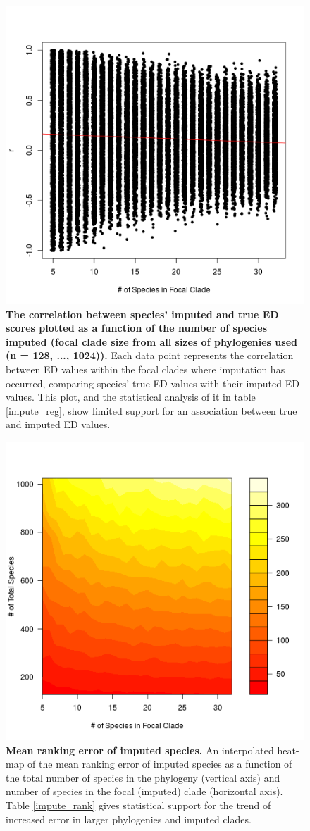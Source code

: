 \documentclass[10pt,english]{article}
\begin{document}
\begin{figure}[!ht]
  \center
  \includegraphics[width=.5\textwidth]{../figures/edModel.png}
  \caption{\textbf{The correlation between species' imputed and true ED scores
      plotted as a function of the number of species imputed (focal clade size
      from all sizes of phylogenies used (n = 128, ..., 1024)).} Each data point
      represents the correlation between ED values within the focal clades where
      imputation has occurred, comparing species' true ED values with their
      imputed ED values. This plot, and the statistical analysis of it in table
      \ref{impute_reg}, show limited support for an association between true and
      imputed ED values.}
  \label{imputationTrend}
\end{figure}

\begin{figure}[!ht]
  \center
  \includegraphics[width=.5\textwidth]{../figures/rankingError.png}
  \caption{\textbf{Mean ranking error of imputed species.} An
    interpolated heat-map of the mean ranking error of imputed species
    as a function of the total number of species in the phylogeny
    (vertical axis) and number of species in the focal (imputed) clade
    (horizontal axis). Table \ref{impute_rank} gives statistical
    support for the trend of increased error in larger phylogenies and
    imputed clades.}
  \label{rankingError}
\end{figure}
\end{document}
